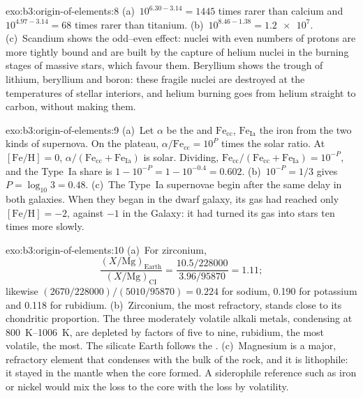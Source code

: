 \begin{solution}{exo:b3:origin-of-elements:8}
(a)~$10^{6.30 - 3.14} = 1445$ times rarer than calcium and
$10^{4.97 - 3.14} = 68$ times rarer than titanium. (b)~$10^{8.46 - 1.38}
= \num{1.2e7}$. (c)~Scandium shows the odd--even effect: nuclei with
even numbers of protons are more tightly bound and are built by the
capture of helium nuclei in the burning stages of massive stars, which
favour them. Beryllium shows the trough of lithium, beryllium and boron:
these fragile nuclei are destroyed at the temperatures of stellar
interiors, and helium burning goes from helium straight to carbon,
without making them.
\end{solution}

\begin{solution}{exo:b3:origin-of-elements:9}
(a)~Let $\alpha$ be the  and $\mathrm{Fe}_\mathrm{cc}$,
$\mathrm{Fe}_\mathrm{Ia}$ the iron from the two kinds of supernova. On
the plateau, $\alpha/\mathrm{Fe}_\mathrm{cc} = 10^{P}$ times the solar
ratio. At $[\mathrm{Fe/H}] = 0$, $\alpha/(\mathrm{Fe}_\mathrm{cc} +
\mathrm{Fe}_\mathrm{Ia})$ is solar. Dividing,
$\mathrm{Fe}_\mathrm{cc}/(\mathrm{Fe}_\mathrm{cc} + \mathrm{Fe}_\mathrm{Ia})
= 10^{-P}$, and the Type~Ia share is $1 - 10^{-P} = 1 - 10^{-0.4} =
\num{0.602}$. (b)~$10^{-P} = 1/3$ gives $P = \log_{10}3 = 0.48$.
(c)~The Type~Ia supernovae begin after the same delay in both galaxies.
When they began in the dwarf galaxy, its gas had reached only
$[\mathrm{Fe/H}] = -2$, against $-1$ in the Galaxy: it had turned its gas
into stars ten times more slowly.
\end{solution}

\begin{solution}{exo:b3:origin-of-elements:10}
(a)~For zirconium,
\[
\frac{(X/\mathrm{Mg})_\mathrm{Earth}}{(X/\mathrm{Mg})_\mathrm{CI}} =
\frac{10.5/228000}{3.96/95870} = 1.11 ;
\]
likewise $(2670/228000)/(5010/95870) = 0.224$ for sodium,
\num{0.190} for potassium and \num{0.118} for rubidium. (b)~Zirconium, the most refractory, stands
close to its chondritic proportion. The three moderately volatile
alkali metals, condensing at \qtyrange{800}{1006}{K}, are depleted by
factors of five to nine, rubidium, the most volatile, the most. The
silicate Earth follows the . (c)~Magnesium is a major,
refractory element that condenses with the bulk of the rock, and it is
lithophile: it stayed in the mantle when the core formed. A siderophile
reference such as iron or nickel would mix the loss to the core with the
loss by volatility.
\end{solution}

